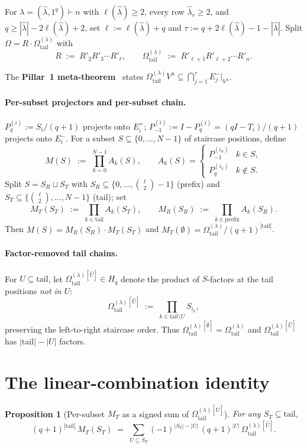 \documentclass[11pt]{article}
\newtheorem{proposition}[theorem]{Proposition}
\theoremstyle{definition}
\newcommand{\Hq}{H_q}
\newcommand{\Vlam}{V^\lambda}
\newcommand{\Om}{\Omega}
\newcommand{\Omtail}{\Om^{(\lambda)}_{\mathrm{tail}}}
\newcommand{\hatl}{\widehat\lambda}
\newcommand{\elh}{\ell(\hatl)}
\newcommand{\Rp}{R'}
\newcommand{\Eplus}[1]{E^+_{#1}}
\newcommand{\Eminus}[1]{E^-_{#1}}
\begin{document}
For $\lambda = (\hatl, 1^q) \vdash n$ with $\elh \ge 2$, every row $\hatl_r
\ge 2$, and $q \ge |\hatl| - 2\elh + 2$, set $\ell := \elh + q$ and
$\tau := q + 2\elh - 1 - |\hatl|$. Split $\Om = R \cdot \Omtail$ with
\[
   R \;:=\; \Rp_2 \Rp_3 \cdots \Rp_\ell,
   \qquad
   \Omtail \;:=\; \Rp_{\ell+1} \Rp_{\ell+2} \cdots \Rp_n.
\]

The \textbf{Pillar~1 meta-theorem}~\cite{pillar1} states
$\Omtail \Vlam \subseteq \bigcap_{j=1}^\tau \Eminus j|_{\Vlam}$.

\paragraph{Per-subset projectors and per-subset chain.}
$P_q^{(i)} := S_i/(q+1)$ projects onto $\Eplus i$;
$P_{-1}^{(i)} := I - P_q^{(i)} = (qI - T_i)/(q+1)$ projects onto $\Eminus i$.
For a subset $S \subseteq \{0, \ldots, N-1\}$ of staircase positions, define
\[
   M(S) \;:=\; \prod_{k=0}^{N-1} A_k(S),
   \qquad
   A_k(S) = \begin{cases} P_{-1}^{(i_k)} & k \in S, \\
                          P_q^{(i_k)} & k \notin S. \end{cases}
\]
Split $S = S_R \sqcup S_T$ with $S_R \subseteq \{0, \ldots, \binom{\ell}{2}-1\}$
(prefix) and $S_T \subseteq \{\binom{\ell}{2}, \ldots, N-1\}$ (tail); set
\[
   M_T(S_T) \;:=\; \prod_{k \in \mathrm{tail}} A_k(S_T),
   \qquad
   M_R(S_R) \;:=\; \prod_{k \in \mathrm{prefix}} A_k(S_R).
\]
Then $M(S) = M_R(S_R) \cdot M_T(S_T)$ and $M_T(\emptyset) = \Omtail/(q+1)^{|\mathrm{tail}|}$.

\paragraph{Factor-removed tail chains.}
For $U \subseteq \mathrm{tail}$, let $\Omtail^{[\widehat U]} \in \Hq$ denote
the product of $S$-factors at the tail positions \emph{not in $U$}:
\[
   \Omtail^{[\widehat U]} \;:=\; \prod_{k \in \mathrm{tail} \setminus U} S_{i_k},
\]
preserving the left-to-right staircase order. Thus
$\Omtail^{[\widehat\emptyset]} = \Omtail$ and
$\Omtail^{[\widehat U]}$ has $|\mathrm{tail}| - |U|$ factors.

\section{The linear-combination identity}\label{sec:identity}

\begin{proposition}[Per-subset $M_T$ as a signed sum of $\Omtail^{[\widehat U]}$]
\label{prop:identity}
For any $S_T \subseteq \mathrm{tail}$,
\begin{equation}\label{eq:identity}
   (q+1)^{|\mathrm{tail}|}\, M_T(S_T) \;=\;
   \sum_{U \subseteq S_T} (-1)^{|S_T|-|U|}\, (q+1)^{|U|}\, \Omtail^{[\widehat U]}.
\end{equation}
\end{proposition}
\end{document}
